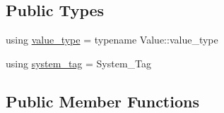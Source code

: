 \subsection*{Public Types}
\begin{DoxyCompactItemize}
\item 
using \hyperlink{structbc_1_1tensors_1_1exprs_1_1Un__Op_3_01oper_1_1transpose_3_01System__Tag_01_4_00_01Value_01_4_af3bea447d72f0bee565062dd9547973d}{value\+\_\+type} = typename Value\+::value\+\_\+type
\item 
using \hyperlink{structbc_1_1tensors_1_1exprs_1_1Un__Op_3_01oper_1_1transpose_3_01System__Tag_01_4_00_01Value_01_4_aebdf1bf20e63a8917fbd036e56bfd191}{system\+\_\+tag} = System\+\_\+\+Tag
\end{DoxyCompactItemize}
\subsection*{Public Member Functions}
